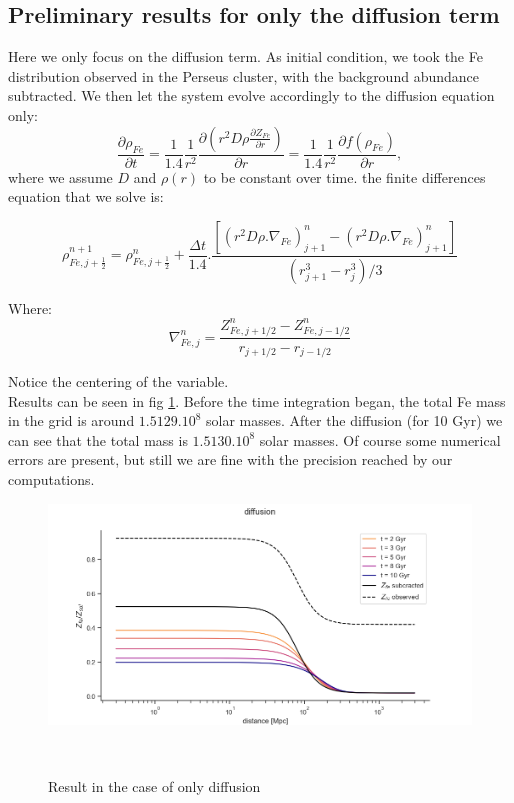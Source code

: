 \documentclass{article}
\begin{document}
\newpage
\subsection{Preliminary results for only the diffusion term}
Here we only focus on the diffusion term. As initial condition, we took the Fe distribution observed in the Perseus cluster, with the background abundance subtracted. We then let the system evolve accordingly to the diffusion equation only:
\[
\frac{\partial \rho_{Fe}}{\partial t}=\frac{1}{1.4}\frac{1}{r^{2}}\frac{\partial(r^{2}D\rho \frac{\partial Z_{Fe}}{\partial r})}{\partial r}=\frac{1}{1.4}\frac{1}{r^{2}}\frac{\partial f(\rho_{Fe})}{\partial r},
\]
where we assume \(D\) and \(\rho(r)\) to be constant over time. the finite differences equation that we solve is:

\begin{equation}
    \rho^{n+1}_{Fe,j+\frac{1}{2}} =  \rho^{n}_{Fe,j+\frac{1}{2}} + \frac{\Delta t}{1.4}.\frac{[(r^2D\rho.\nabla_{Fe})^n_{j+1}-(r^2D\rho.\nabla_{Fe})^n_{j+1}]}{(r^3_{j+1}-r^3_{j})/3}
\end{equation}

Where:
\begin{equation}
   \nabla_{Fe,j}^n = \frac{Z^n_{Fe,j+1/2}-Z^n_{Fe,j-1/2}}{r_{j+1/2}-r_{j-1/2}}
\end{equation}

Notice the centering of the variable.\\

Results can be seen in fig \ref{fig:figure 7}. Before the time integration began, the total Fe mass in the grid is around $1.5129.10^{8}$ solar masses. After the diffusion (for 10 Gyr) we can see that the total mass is $1.5130.10^{8}$
solar masses. Of course some numerical errors are present, but still we are fine with the precision reached by our computations.
\begin{figure}[ht]
 \begin{minipage}[b]{8cm}
   
   \includegraphics[trim = 0 0 0 10,width=16cm]{Figure_1.png}
   \caption{Result in the case of only diffusion}
   \label{fig:figure 7}
 \end{minipage}
 \ \hspace{2mm} \hspace{1mm} \
\end{figure}
\end{document}
